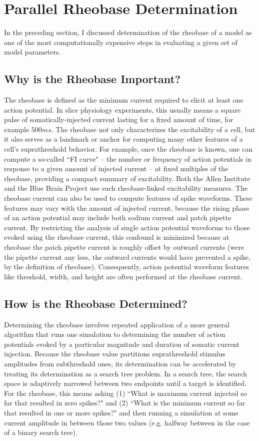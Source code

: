 \section{Parallel Rheobase Determination}\label{sec:parallel-rheobase}
In the preceding section, I discussed determination of the rheobase of a model as one of the most computationally expensive steps in evaluating a given set of model parameters. 

\subsection{Why is the Rheobase Important?}
The rheobase is defined as the minimum current required to elicit at least one action potential.
In slice physiology experiments, this usually means a square pulse of somatically-injected current lasting for a fixed amount of time, for example $500 ms$.
The rheobase not only characterizes the excitability of a cell, but it also serves as a landmark or anchor for computing many other features of a cell's suprathreshold behavior.
For example, once the rheobase is known, one can compute a so-called ``FI curve" -- the number or frequency of action potentials in response to a given amount of injected current -- at fixed multiples of the rheobase, providing a compact summary of excitability.
Both the Allen Institute and the Blue Brain Project use such rheobase-linked excitability measures.
The rheobase current can also be used to compute features of spike waveforms.
These features may vary with the amount of injected current, because the rising phase of an action potential may include both sodium current and patch pipette current.
By restricting the analysis of single action potential waveforms to those evoked using the rheobase current, this confound is minimized because at rheobase the patch pipette current is roughly offset by outward currents (were the pipette current any less, the outward currents would have prevented a spike, by the definition of rheobase).
Consequently, action potential waveform features like threshold, width, and height are often performed at the rheobase current.

\subsection{How is the Rheobase Determined?}
Determining the rheobase involves repeated application of a more general algorithm that runs one simulation to determining the number of action potentials evoked by a particular magnitude and duration of somatic current injection.
Because the rheobase value partitions suprathreshold stimulus amplitudes from subthreshold ones, its determination can be accelerated by treating its determination as a search tree problem.
In a search tree, the search space is adaptively narrowed between two endpoints until a target is identified.
For the rheobase, this means asking (1) ``What is maximum current injected so far that resulted in zero spikes?" and (2) ``What is the minimum current so far that resulted in one or more spikes?" and then running a simulation at some current amplitude in between those two values (e.g. halfway between in the case of a binary search tree).

